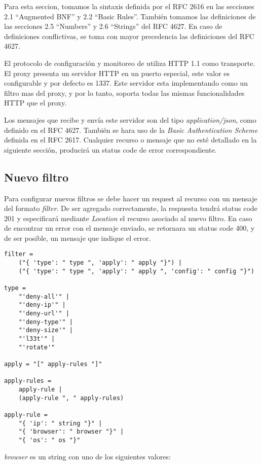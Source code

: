 \documentclass[11pt,a4paper,titlepage]{article}
\begin{document}
Para esta seccion, tomamos la sintaxis definida por el RFC 2616 en las secciones 2.1 ``Augmented BNF'' y 2.2 ``Basic Rules''.
También tomamos las definiciones de las secciones 2.5 ``Numbers'' y 2.6 ``Strings'' del RFC 4627.
En caso de definiciones conflictivas, se toma con mayor precedencia las definiciones del RFC 4627.

El protocolo de configuración y monitoreo de \duta utiliza HTTP 1.1 como transporte.
El proxy presenta un servidor HTTP en un puerto especial, este valor es configurable y por defecto es 1337.
Este servidor esta implementando como un filtro mas del proxy, y por lo tanto, soporta todas las mismas funcionalidades HTTP que el proxy.

Los mensajes que recibe y envía este servidor son del tipo \textit{application/json}, como definido en el RFC 4627.
También se hara uso de la \textit{Basic Authentication Scheme} definida en el RFC 2617.
Cualquier recurso o mensaje que no esté detallado en la siguiente sección, producirá un status code de error correspondiente.

\subsection{Nuevo filtro}
\label{sec:new-filter}
Para configurar nuevos filtros se debe hacer un request  al recurso  con un mensaje del formato \textit{filter}.
De ser agregado correctamente, la respuesta tendrá status code 201 y especificará mediante \textit{Location} el recurso asociado al nuevo filtro.
En caso de encontrar un error con el mensaje enviado, se retornara un status code 400, y de ser posible, un mensaje que indique el error.

\begin{verbatim}
filter =
    ("{ 'type': " type ", 'apply': " apply "}") |
    ("{ 'type': " type ", 'apply': " apply ", 'config': " config "}")

type =
    "'deny-all'" |
    "'deny-ip'" |
    "'deny-url'" |
    "'deny-type'" |
    "'deny-size'" |
    "'l33t'" |
    "'rotate'"

apply = "[" apply-rules "]"

apply-rules =
    apply-rule |
    (apply-rule ", " apply-rules)

apply-rule =
    "{ 'ip': " string "}" |
    "{ 'browser': " browser "}" |
    "{ 'os': " os "}"

\end{verbatim}

\textit{browser} es un string con uno de los siguientes valores:
\end{document}
